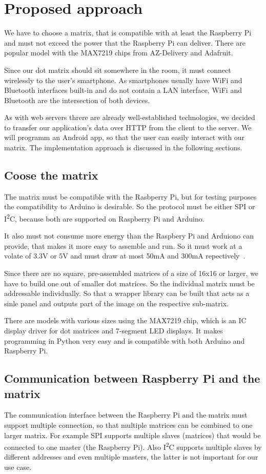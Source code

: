 \documentclass[conference]{IEEEtran}
\begin{document}
\section{Proposed approach}
We have to choose a matrix, that is compatible with at least the Raspberry Pi and must not exceed the power that the Raspberry Pi can deliver. There are popular model with the MAX7219 chips from AZ-Delivery and Adafruit.

Since our dot matrix should sit somewhere in the room, it must connect wirelessly to the user's smartphone. As smartphones usually have WiFi and Bluetooth interfaces built-in and do not contain a LAN interface, WiFi and Bluetooth are the intersection of both devices.

As with web servers threre are already well-established technologies, we decided to transfer our application's data over HTTP from the client to the server. We will programm an Android app, so that the user can easily interact with our matrix. The implementation approach is discussed in the following sections.


\subsection{Coose the matrix}
The matrix must be compatible with the Rasbperry Pi, but for testing purposes the compatibility to Arduino is desirable. So the protocol must be either SPI or I\textsuperscript{2}C, because both are supported on Raspberry Pi and Arduino.

It also must not consume more energy than the Raspbery Pi and Arduiono can provide, that makes it more easy to assemble and run. So it must work at a volate of 3.3V or 5V and must draw at most 50mA and 300mA repectively~\cite{rpiperipherals}.

Since there are no square, pre-assembled matrices of a size of 16x16 or larger, we have to build one out of smaller dot matrices. So the individual matrix must be addressable individually. So that a wrapper library can be built that acts as a sinle panel and outputs part of the image on the respective sub-matrix.

There are models with various sizes using the MAX7219 chip, which is an IC display driver for dot matrices and 7-segment LED displays. It makes programming in Python very easy and is compatible with both Arduino and Raspberry Pi.

\subsection{Communication between Raspberry Pi and the matrix}
The communication interface between the Raspberry Pi and the matrix must support multiple connection, so that multiple matrices can be combined to one larger matrix. For example SPI supports multiple slaves (matrices) that would be connected to one master (the Raspberry Pi). Also I\textsuperscript{2}C supports multiple slaves by different addresses and even multiple masters, the latter is not important for our use case.
\end{document}
